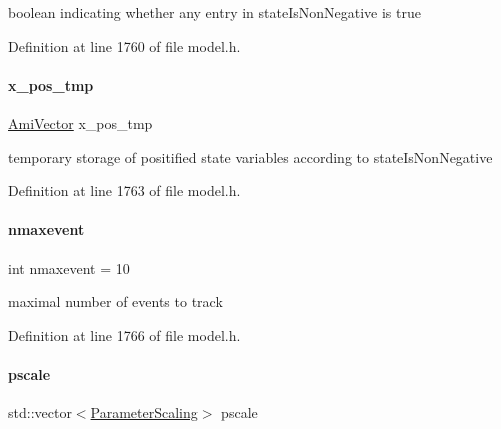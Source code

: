 boolean indicating whether any entry in state\+Is\+Non\+Negative is {\ttfamily true} 

Definition at line 1760 of file model.\+h.

\mbox{\label{classamici_1_1_model_a2dc43104a5b25d9689d827fc51f04346}} 
\paragraph{\texorpdfstring{x\+\_\+pos\+\_\+tmp}{x\_pos\_tmp}}
{\footnotesize\ttfamily \mbox{\hyperlink{classamici_1_1_ami_vector}{Ami\+Vector}} x\+\_\+pos\+\_\+tmp\hspace{0.3cm}{\ttfamily [protected]}}

temporary storage of positified state variables according to state\+Is\+Non\+Negative 

Definition at line 1763 of file model.\+h.

\mbox{\label{classamici_1_1_model_aff0f3f25d886279a90dbf0571956885c}} 
\paragraph{\texorpdfstring{nmaxevent}{nmaxevent}}
{\footnotesize\ttfamily int nmaxevent = 10\hspace{0.3cm}{\ttfamily [protected]}}

maximal number of events to track 

Definition at line 1766 of file model.\+h.

\mbox{\label{classamici_1_1_model_a5d1c7237dc998202fe1b3393b50f77ce}} 
\paragraph{\texorpdfstring{pscale}{pscale}}
{\footnotesize\ttfamily std\+::vector$<$\mbox{\hyperlink{namespaceamici_a42f062082226e9284c201d9eab71a3a0}{Parameter\+Scaling}}$>$ pscale\hspace{0.3cm}{\ttfamily [protected]}}

